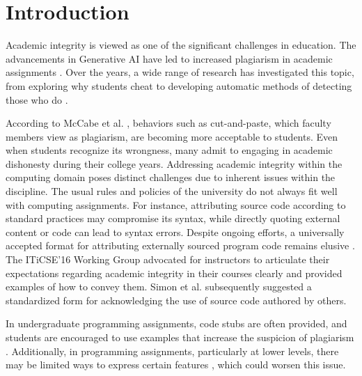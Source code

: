 \section{Introduction} \label{sec:intro}

Academic integrity is viewed as one of the significant challenges in education. The advancements in Generative AI have led to increased plagiarism in academic assignments \cite{shiriChatGPTAcademicIntegrity2023}. Over the years, a wide range of research has investigated this topic, from exploring why students cheat to developing automatic methods of detecting those who do \cite{10.5120/ijca2015906113}.  

According to McCabe et al. \cite{84f6c08b47844b54868caf82c625fc66}, behaviors such as cut-and-paste, which faculty members view as plagiarism, are becoming more acceptable to students. Even when students recognize its wrongness, many admit to engaging in academic dishonesty during their college years\cite{Bernardi2004-BERETD}. Addressing academic integrity within the computing domain poses distinct challenges due to inherent issues within the discipline. The usual rules and policies of the university do not always fit well with computing assignments. For instance, attributing source code according to standard practices may compromise its syntax, while directly quoting external content or code can lead to syntax errors. Despite ongoing efforts, a universally accepted format for attributing externally sourced program code remains elusive \cite{10.1145/1562877.1562900}. The ITiCSE’16 Working Group \cite{10.1145/3024906.3024910} advocated for instructors to articulate their expectations regarding academic integrity in their courses clearly and provided examples of how to convey them. Simon et al.\cite{10.1145/3160489.3160502} subsequently suggested a standardized form for acknowledging the use of source code authored by others. 

In undergraduate programming assignments, code stubs are often provided, and students are encouraged to use examples that increase the suspicion of plagiarism \cite{10.5555/1151869.1151888}. Additionally, in programming assignments, particularly at lower levels, there may be limited ways to express certain features \cite{10.1145/3160489.3160502}, which could worsen this issue.


